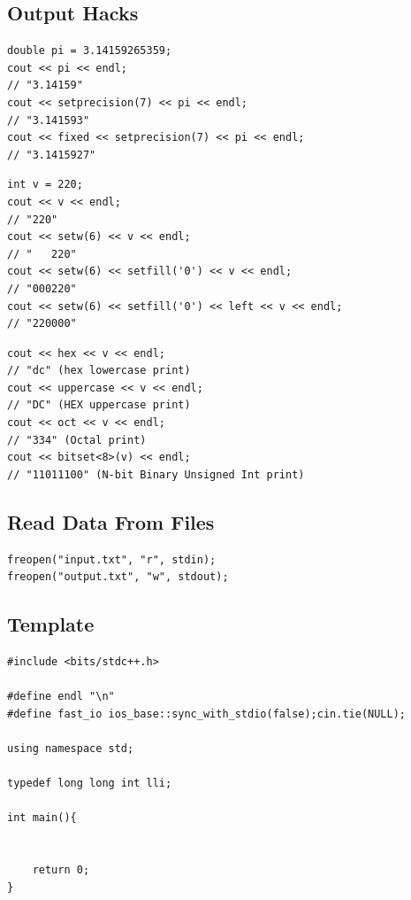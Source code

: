 \documentclass[twoside]{article}
\begin{document}
\begin{multicols*}{2}
\begin{verbatim}
\end{verbatim}

\subsectionfont{\large\bfseries\sffamily\underline}
\subsection*{Output Hacks}
\begin{verbatim}
double pi = 3.14159265359;
cout << pi << endl;
// "3.14159"
cout << setprecision(7) << pi << endl;
// "3.141593"
cout << fixed << setprecision(7) << pi << endl;
// "3.1415927"

\end{verbatim}
\vspace{-12pt}
\begin{verbatim}
int v = 220;
cout << v << endl;
// "220"
cout << setw(6) << v << endl;
// "   220"
cout << setw(6) << setfill('0') << v << endl;
// "000220"
cout << setw(6) << setfill('0') << left << v << endl;
// "220000"

\end{verbatim}
\vspace{-12pt}
\begin{verbatim}
cout << hex << v << endl;
// "dc" (hex lowercase print)
cout << uppercase << v << endl;
// "DC" (HEX uppercase print)
cout << oct << v << endl;
// "334" (Octal print)
cout << bitset<8>(v) << endl;
// "11011100" (N-bit Binary Unsigned Int print)

\end{verbatim}

\subsectionfont{\large\bfseries\sffamily\underline}
\subsection*{Read Data From Files}
\begin{verbatim}
freopen("input.txt", "r", stdin);
freopen("output.txt", "w", stdout);

\end{verbatim}

\subsectionfont{\large\bfseries\sffamily\underline}
\subsection*{Template}
\begin{verbatim}
#include <bits/stdc++.h>

#define endl "\n"
#define fast_io ios_base::sync_with_stdio(false);cin.tie(NULL);

using namespace std;

typedef long long int lli;

int main(){


	return 0;
}
\end{verbatim}

\end{multicols*}
\end{document}
